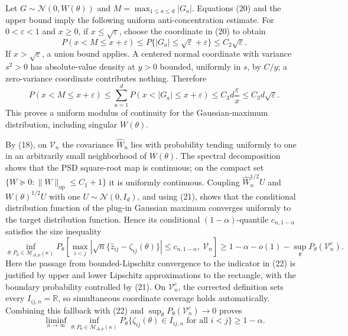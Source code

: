 Let \(G\sim\mathcal N(0,W(\theta))\) and \(M=\max_{1\leq a\leq d}|G_a|\).  Equations (20) and the upper bound imply the following uniform anti-concentration estimate.  For \(0<\varepsilon<1\) and \(x\geq0\), if \(x\leq\sqrt\varepsilon\), choose the coordinate in (20) to obtain
\[
 P(x<M\leq x+\varepsilon)
 \leq P\{|G_a|\leq\sqrt\varepsilon+\varepsilon\}
 \leq C_2\sqrt\varepsilon.
\]
If \(x>\sqrt\varepsilon\), a union bound applies.  A centered normal coordinate with variance \(s^2>0\) has absolute-value density at \(y>0\) bounded, uniformly in \(s\), by \(C/y\); a zero-variance coordinate contributes nothing.  Therefore
\[
 P(x<M\leq x+\varepsilon)
 \leq\sum_{a=1}^dP(x<|G_a|\leq x+\varepsilon)
 \leq C_3d\frac{\varepsilon}{x}
 \leq C_3d\sqrt\varepsilon.
\tag{21}
\]
This proves a uniform modulus of continuity for the Gaussian-maximum distribution, including singular \(W(\theta)\).

By (18), on \(\mathcal V_n\) the covariance \(\widehat W_n\) lies with probability tending uniformly to one in an arbitrarily small neighborhood of \(W(\theta)\).  The spectral decomposition shows that the PSD square-root map is continuous; on the compact set \(\{W\succeq0:\lVert W\rVert_{\mathrm{op}}\leq C_1+1\}\) it is uniformly continuous.  Coupling \(\widehat W_n^{1/2}U\) and \(W(\theta)^{1/2}U\) with one \(U\sim\mathcal N(0,I_d)\), and using (21), shows that the conditional distribution function of the plug-in Gaussian maximum converges uniformly to the target distribution function.  Hence its conditional \((1-\alpha)\)-quantile \(c_{n,1-\alpha}\) satisfies the size inequality
\[
 \inf_{\theta:P_\theta\in\mathcal M_{\Delta,p}(\kappa)}
 P_\theta\!\left[
 \max_{i<j}\left|\sqrt n\{\widehat z_{ij}-\zeta_{ij}(\theta)\}\right|
 \leq c_{n,1-\alpha},\ \mathcal V_n\right]
 \geq1-\alpha-o(1)-\sup_\theta P_\theta(\mathcal V_n^c).
\tag{22}
\]
Here the passage from bounded-Lipschitz convergence to the indicator in (22) is justified by upper and lower Lipschitz approximations to the rectangle, with the boundary probability controlled by (21).  On \(\mathcal V_n^c\), the corrected definition sets every \(I_{ij,n}=\mathbb R\), so simultaneous coordinate coverage holds automatically.  Combining this fallback with (22) and \(\sup_\theta P_\theta(\mathcal V_n^c)\to0\) proves
\[
 \liminf_{n\to\infty}\inf_{\theta:P_\theta\in\mathcal M_{\Delta,p}(\kappa)}
 P_\theta\{\zeta_{ij}(\theta)\in I_{ij,n}\text{ for all }i<j\}
 \geq1-\alpha.
\]

